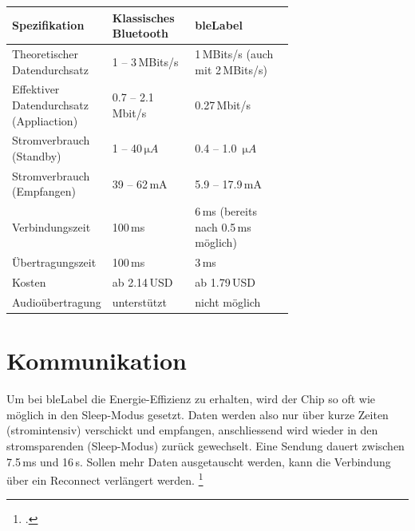 \begin{table}[H]
	\small\sffamily\renewcommand{\arraystretch}{1.4}
	\begin{tabular}{p{0.35\linewidth}lp{0.35\linewidth}}
		\toprule
		Spezifikation & Klassisches Bluetooth & \gls{bleLabel}\\
		\midrule
		Theoretischer Datendurchsatz & 1 -- 3\,MBits/s & 1\,MBits/s (auch mit 2\,MBits/s)\\
		Effektiver Datendurchsatz (Appliaction)  & 0.7 -- 2.1\,Mbit/s	& 0.27\,Mbit/s\\
		
		Stromverbrauch (Standby) & 1 -- 40\,$\si{\micro A}$ &  0.4 -- 1.0 \,$\si{\micro A}$ \\
		Stromverbrauch (Empfangen) & 39 -- 62\,mA &  5.9 -- 17.9\,mA \\
		
		Verbindungszeit & 100\,ms & 6\,ms (bereits nach 0.5\,ms möglich)\\
		Übertragungszeit & 100\,ms & 3\,ms\\
		Kosten & ab 2.14\,USD & ab 1.79\,USD \\
		Audioübertragung & unterstützt & nicht möglich\\
		\bottomrule
	\end{tabular}
\end{table}


\section{Kommunikation}
Um bei \gls{bleLabel} die Energie-Effizienz zu erhalten, wird der Chip so oft wie möglich in den Sleep-Modus gesetzt. Daten werden also nur über kurze Zeiten (stromintensiv) verschickt und empfangen, anschliessend wird wieder in den stromsparenden (Sleep-Modus) zurück gewechselt.
Eine Sendung dauert zwischen 7.5\,ms und 16\,s.
Sollen mehr Daten ausgetauscht werden, kann die Verbindung über ein Reconnect verlängert werden.
\footcite[][5]{ti_whitepaper_2015-05-08}

